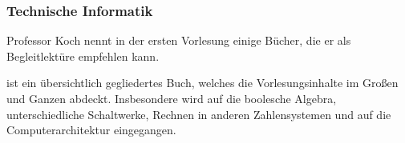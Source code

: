 


\subsubsection{Technische Informatik}
Professor Koch nennt in der ersten Vorlesung einige Bücher, die er als Begleitlektüre empfehlen kann.

\begin{description}[style=unboxed]
\item[Clements: The Principles of Computer Hardware]{
	ist ein übersichtlich gegliedertes Buch, welches die Vorlesungsinhalte im Großen und Ganzen abdeckt. Insbesondere wird auf die boolesche Algebra, unterschiedliche Schaltwerke, Rechnen in anderen Zahlensystemen und auf die Computerarchitektur eingegangen.}
\end{description}

